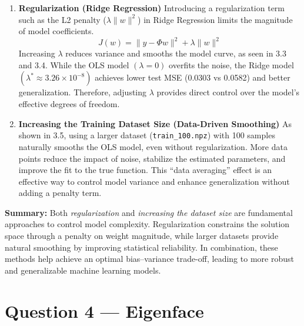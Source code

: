 \documentclass[12pt]{article}
\begin{document}
\begin{enumerate}
    \item \textbf{Regularization (Ridge Regression)}  
    Introducing a regularization term such as the L2 penalty ($\lambda\|w\|^2$) in Ridge Regression limits the magnitude of model coefficients.  
    \[
    J(w) = \|y - \Phi w\|^2 + \lambda\|w\|^2
    \]
    Increasing $\lambda$ reduces variance and smooths the model curve, as seen in 3.3 and 3.4.  
    While the OLS model $(\lambda=0)$ overfits the noise, the Ridge model $(\lambda^* \approx 3.26\times10^{-8})$ achieves lower test MSE (0.0303 vs 0.0582) and better generalization.  
    Therefore, adjusting $\lambda$ provides direct control over the model’s effective degrees of freedom.

    \item \textbf{Increasing the Training Dataset Size (Data-Driven Smoothing)}  
    As shown in 3.5, using a larger dataset (\texttt{train\_100.npz}) with 100 samples naturally smooths the OLS model, even without regularization.  
    More data points reduce the impact of noise, stabilize the estimated parameters, and improve the fit to the true function.  
    This “data averaging” effect is an effective way to control model variance and enhance generalization without adding a penalty term.
\end{enumerate}

\textbf{Summary:}  
Both \textit{regularization} and \textit{increasing the dataset size} are fundamental approaches to control model complexity.  
Regularization constrains the solution space through a penalty on weight magnitude, while larger datasets provide natural smoothing by improving statistical reliability.  
In combination, these methods help achieve an optimal bias–variance trade-off, leading to more robust and generalizable machine learning models.

\newpage
\section*{Question 4 — Eigenface}
\end{document}
